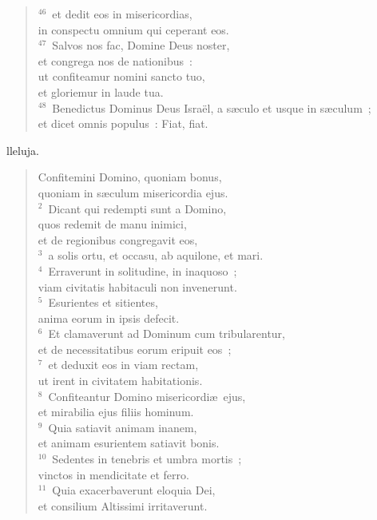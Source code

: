 \begin{verse}
${}^{46}$~et dedit eos in misericordias,\\ in conspectu omnium qui ceperant eos.\\
${}^{47}$~Salvos nos fac, Domine Deus noster,\\ et congrega nos de nationibus~:\\ ut confiteamur nomini sancto tuo,\\ et gloriemur in laude tua.\\
${}^{48}$~Benedictus Dominus Deus Isra\"el, a s\ae culo et usque in s\ae culum~;\\ et dicet omnis populus~: Fiat, fiat.\end{verse}



\bchapter[Psalm]
lleluja. \begin{verse}Confitemini Domino, quoniam bonus,\\ quoniam in s\ae culum misericordia ejus.\\
${}^{2}$~Dicant qui redempti sunt a Domino,\\ quos redemit de manu inimici,\\ et de regionibus congregavit eos,\\
${}^{3}$~a solis ortu, et occasu, ab aquilone, et mari.\\
${}^{4}$~Erraverunt in solitudine, in inaquoso~;\\ viam civitatis habitaculi non invenerunt.\\
${}^{5}$~Esurientes et sitientes,\\ anima eorum in ipsis defecit.\\
${}^{6}$~Et clamaverunt ad Dominum cum tribularentur,\\ et de necessitatibus eorum eripuit eos~;\\
${}^{7}$~et deduxit eos in viam rectam,\\ ut irent in civitatem habitationis.\\
${}^{8}$~Confiteantur Domino misericordi\ae\ ejus,\\ et mirabilia ejus filiis hominum.\\
${}^{9}$~Quia satiavit animam inanem,\\ et animam esurientem satiavit bonis.\\
${}^{10}$~Sedentes in tenebris et umbra mortis~;\\ vinctos in mendicitate et ferro.\\
${}^{11}$~Quia exacerbaverunt eloquia Dei,\\ et consilium Altissimi irritaverunt.\\

\end{verse}
